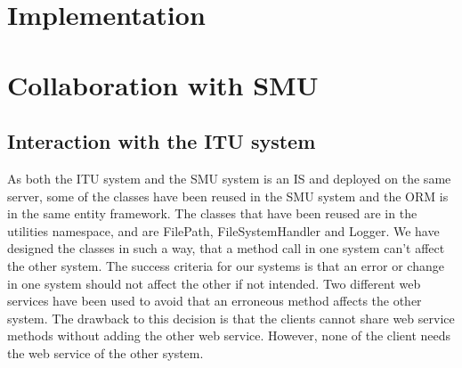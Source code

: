 \documentclass[a4paper,11pt,report]{article}
\begin{document}
\section{Implementation}

\section{Collaboration with SMU}

\subsection{Interaction with the ITU system}
As both the ITU system and the SMU system is an IS and deployed on the same server,  some of the classes have been reused in the SMU system and the ORM is in the same entity framework.
The classes that have been reused are in the utilities namespace, and are FilePath, FileSystemHandler and Logger. We have designed the classes in such a way, that a method call in one system can't affect the other system.
The success criteria for our systems is that an error or change in one system should not affect the other if not intended. Two different web services have been used to avoid that an erroneous method affects the other system.
The drawback to this decision is that the clients cannot share web service methods without adding the other web service. However, none of the client needs the web service of the other system. 
\end{document}

